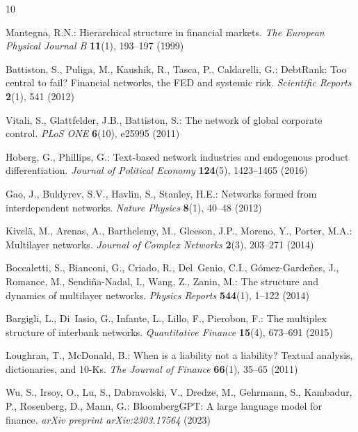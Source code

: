 \begin{thebibliography}{10}
\providecommand{\url}[1]{\texttt{#1}}
\providecommand{\urlprefix}{URL }
\providecommand{\doi}[1]{https://doi.org/#1}

Mantegna, R.N.: Hierarchical structure in financial markets. \emph{The European Physical Journal B} \textbf{11}(1), 193--197 (1999)

Battiston, S., Puliga, M., Kaushik, R., Tasca, P., Caldarelli, G.: DebtRank: Too central to fail? Financial networks, the FED and systemic risk. \emph{Scientific Reports} \textbf{2}(1), 541 (2012)

Vitali, S., Glattfelder, J.B., Battiston, S.: The network of global corporate control. \emph{PLoS ONE} \textbf{6}(10), e25995 (2011)

Hoberg, G., Phillips, G.: Text-based network industries and endogenous product differentiation. \emph{Journal of Political Economy} \textbf{124}(5), 1423--1465 (2016)

Gao, J., Buldyrev, S.V., Havlin, S., Stanley, H.E.: Networks formed from interdependent networks. \emph{Nature Physics} \textbf{8}(1), 40--48 (2012)

Kivel{\"a}, M., Arenas, A., Barthelemy, M., Gleeson, J.P., Moreno, Y., Porter, M.A.: Multilayer networks. \emph{Journal of Complex Networks} \textbf{2}(3), 203--271 (2014)

Boccaletti, S., Bianconi, G., Criado, R., Del~Genio, C.I., G{\'o}mez-Garde{\~n}es, J., Romance, M., Sendi{\~n}a-Nadal, I., Wang, Z., Zanin, M.: The structure and dynamics of multilayer networks. \emph{Physics Reports} \textbf{544}(1), 1--122 (2014)

Bargigli, L., Di~Iasio, G., Infante, L., Lillo, F., Pierobon, F.: The multiplex structure of interbank networks. \emph{Quantitative Finance} \textbf{15}(4), 673--691 (2015)

Loughran, T., McDonald, B.: When is a liability not a liability? Textual analysis, dictionaries, and 10-Ks. \emph{The Journal of Finance} \textbf{66}(1), 35--65 (2011)

Wu, S., Irsoy, O., Lu, S., Dabravolski, V., Dredze, M., Gehrmann, S., Kambadur, P., Rosenberg, D., Mann, G.: BloombergGPT: A large language model for finance. \emph{arXiv preprint arXiv:2303.17564} (2023)

\end{thebibliography}